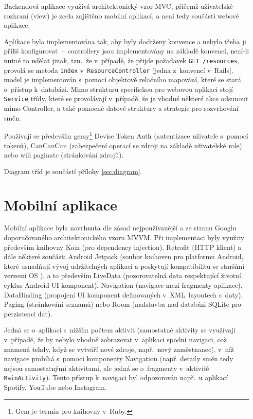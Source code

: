 \documentclass[twoside]{ctuthesis}
\begin{document}
Backendová aplikace využívá architektonický vzor MVC, přičemž uživatelské rozhraní (view) je zcela zajištěno mobilní aplikací, a není tedy součástí webové aplikace.

Aplikace byla implementována tak, aby byly dodrženy konvence a nebylo třeba ji příliš konfigurovat~–~controllery jsou implementovány na základě konvencí, není-li nutné to udělat jinak, tzn.~že v~případě, že přijde požadavek \texttt{GET /resources}, provolá se metoda \texttt{index} v~\texttt{ResourceController} (jedna z~konvencí v~Rails), model je implementován s~pomocí objektově relačního mapování, které se stará o~přístup k~databázi. Mimo strukturu specifickou pro webovou aplikaci stojí \texttt{Service} třídy, které se provolávají v~případě, že je vhodné některé akce odsunout mimo Controller, a také pomocné datové struktury a strategie pro rozvrhování směn.

Používají se především gemy\footnote{Gem je termín pro knihovny v~Ruby.} Devise Token Auth (autentizace uživatele s~pomocí tokenů), CanCanCan (zabezpečení operací se zdroji na základě uživatelské role) nebo will paginate (stránkování zdrojů).

Diagram tříd je součástí přílohy \ref{sec:diagram}.

\section{Mobilní aplikace}

Mobilní aplikace byla navrhnuta dle zásad nejpoužívanější a ze stranu Googlu doporučovaného architektonického vzoru MVVM. Při implementaci byly využity především knihovny Koin (pro dependency injection), Retrofit (HTTP klient) a dále některé součásti Android Jetpack (soubor knihoven pro platformu Android, které usnadňují vývoj udržitelných aplikací a poskytují kompatibilitu se staršími verzemi OS \cite{android2020jetpack}), a to především LiveData (pozorovatelná data respektující životní cyklus Android UI komponent), Navigation (navigace mezi fragmenty aplikace), DataBinding (propojení UI komponent definovaných v~XML~layoutech s~daty), Paging (stránkování seznamů) nebo Room (nadstavba nad databázi SQLite pro perzistenci dat).

Jedná se o~aplikaci s~nižším počtem aktivit (samostatné aktivity se využívají v~případě, že by nebylo vhodné zobrazovat v~aplikaci spodní navigaci, což znamená tehdy, když se vytváří nové zdroje, např.~nový zaměstnanec), v~níž navigace probíhá s~pomocí komponenty Navigation (např. detaily směn tedy nejsou sa\-mos\-tat\-ný\-mi aktivitami, ale jedná se o~fragmenty v~aktivitě \texttt{MainActivity}). Tento přístup k~navigaci byl odpozorován např.~u aplikací Spotify, YouTube nebo Instagram.
\end{document}
